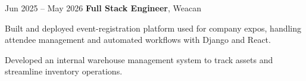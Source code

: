 \begin{twocolentry}{
        Jun 2025 – May 2026
    }
\textbf{Full Stack Engineer}, Weacan\end{twocolentry}

\vspace{0.10 cm}
\begin{onecolentry}
    \begin{highlights}
        \item Built and deployed event-registration platform used for company expos, handling attendee management and automated workflows with Django and React.
        \item Developed an internal warehouse management system to track assets and streamline inventory operations.
    \end{highlights}
\end{onecolentry}